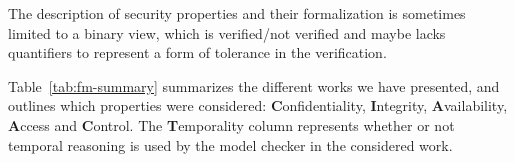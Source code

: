 The description of security properties and their formalization is sometimes limited to a binary view, which is verified/not verified and maybe lacks quantifiers to represent a form of tolerance in the verification.


Table~\ref{tab:fm-summary} summarizes the different works we have presented, and outlines which properties were considered: \textbf{C}onfidentiality, \textbf{I}ntegrity, \textbf{A}vailability, \textbf{A}ccess and \textbf{C}ontrol. 
The \textbf{T}emporality column represents whether or not temporal reasoning is used by the model checker in the considered work.
\begin{table}[h]
\caption{Summary of formal models}
\label{tab:fm-summary}
\end{table}